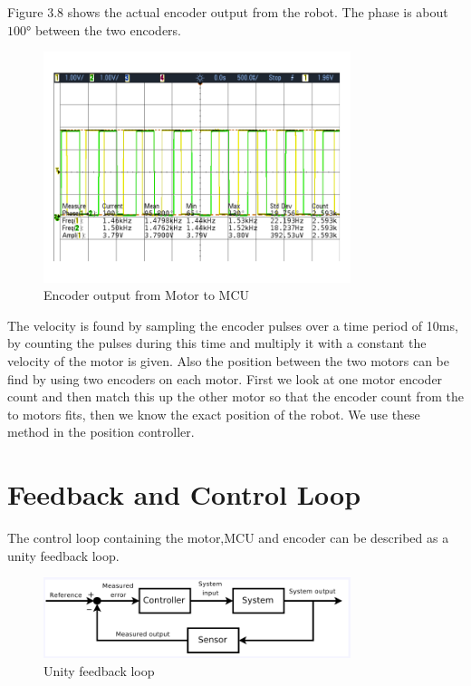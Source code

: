 Figure 3.8 shows the actual encoder output from the robot. The phase is about $\ang{100}$ between the two encoders.
  \begin{figure}[!h!]
	\centering
	\includegraphics[width=0.8\textwidth]{resources/Scop/encoder.png}
	\caption{Encoder output from Motor to MCU}
	\label{fig:6}
\end{figure}
The velocity is found by sampling the encoder pulses over a time period of 10ms, by counting the pulses during this time and multiply it with a constant the velocity of the motor is given.
Also the position between the two motors can be find by using two encoders on each motor. First we look at one motor encoder count and then match this up the other motor so that the encoder count from the to motors fits, then we know the exact position of the robot. We use these method in the position controller.    
\newpage

\section{Feedback and Control Loop}
The control loop containing the motor,MCU and encoder can be described as a unity feedback loop.


  \begin{figure}[!h!]
	\centering
	\includegraphics[width=0.8\textwidth]{resources/feedbackloop.png}
	\caption{Unity feedback loop}
	\label{fig:6}
\end{figure}





